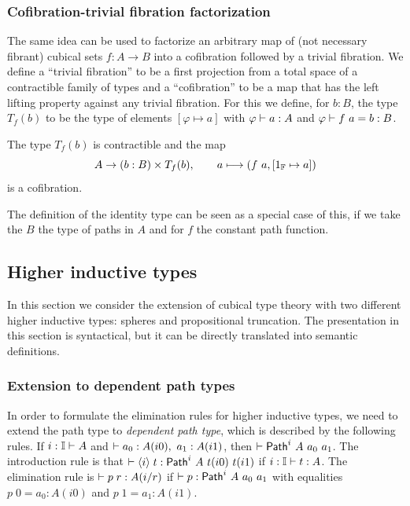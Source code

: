 \subsubsection*{Cofibration-trivial fibration factorization}

The same idea can be used to factorize an arbitrary map of (not
necessary fibrant) cubical sets $f : A \rightarrow B$ into a
cofibration followed by a trivial fibration. We define a ``trivial
fibration'' to be a first projection from a total space of a
contractible family of types and a ``cofibration'' to be a map that
has the left lifting property against any trivial fibration. For this
we define, for $b : B$, the type $T_f(b)$ to be the type of elements
$[\varphi \mapsto a]$ with $\varphi\vdash a : A$ and $\varphi \vdash f~a =
b : B$.
%
\begin{theorem}
The type $T_f(b)$ is contractible and the map
%
\[
  A \rightarrow (b : B) \times T_f(b), %
  \qquad %
  a \longmapsto (f~a,[1_\FF \mapsto a])
\]
%
is a cofibration.
\end{theorem}

The definition of the identity type can be seen as a special case of
this, if we take the $B$ the type of paths in $A$ and for $f$ the
constant path function.

\subsection{Higher inductive types}\label{sec:hits}

In this section we consider the extension of cubical type theory with
two different higher inductive types: spheres and propositional
truncation. The presentation in this section is syntactical, but it
can be directly translated into semantic definitions.


\subsubsection*{Extension to dependent path types}

In order to formulate the elimination rules for higher inductive
types, we need to extend the path type to {\em dependent path type},
which is described by the following rules. If $i : \mathbb{I} \vdash A$ and
$\vdash a_0 : A(i0),~a_1 : A(i1)$, then $\vdash {\sf Path}^i~A~a_0~a_1$. The
introduction rule is that $\vdash {\langle}i{\rangle} \;{t} : {\sf Path}^i~A~t(i0)~t(i1)$
if $i : \mathbb{I} \vdash t : A$. The elimination rule is
$\vdash p \; r : A(i/r)$ if $\vdash p : {\sf Path}^i~A~a_0~a_1$ with
equalities $p \; 0 = a_0 : A(i0)$ and $p \; 1 = a_1 : A(i1)$.

